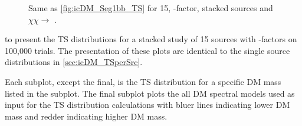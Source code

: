 \begin{figure}[ht]
    \caption{Same as \cref{fig:icDM_Seg1bb_TS} for 15, \GS \J-factor, stacked sources and $\chi\chi \rightarrow$ \parpar{\nu_\mu}.}
    \label{fig:icDM_stact_numu_TS}
\end{figure}

 to  present the TS distributions for a stacked study of 15 sources with \GS \J-factors on 100,000 trials.
The presentation of these plots are identical to the single source distributions in \cref{sec:icDM_TSperSrc}.

Each subplot, except the final, is the TS distribution for a specific DM mass listed in the subplot.
The final subplot plots the all DM spectral models used as input for the TS distribution calculations with bluer lines indicating lower DM mass and redder indicating higher DM mass.

